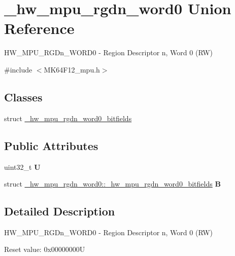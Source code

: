 \hypertarget{union__hw__mpu__rgdn__word0}{}\section{\+\_\+hw\+\_\+mpu\+\_\+rgdn\+\_\+word0 Union Reference}
\label{union__hw__mpu__rgdn__word0}


H\+W\+\_\+\+M\+P\+U\+\_\+\+R\+G\+Dn\+\_\+\+W\+O\+R\+D0 -\/ Region Descriptor n, Word 0 (RW)  




{\ttfamily \#include $<$M\+K64\+F12\+\_\+mpu.\+h$>$}

\subsection*{Classes}
\begin{DoxyCompactItemize}
\item 
struct \hyperlink{struct__hw__mpu__rgdn__word0_1_1__hw__mpu__rgdn__word0__bitfields}{\+\_\+hw\+\_\+mpu\+\_\+rgdn\+\_\+word0\+\_\+bitfields}
\end{DoxyCompactItemize}
\subsection*{Public Attributes}
\begin{DoxyCompactItemize}
\item 
uint32\+\_\+t {\bfseries U}\hypertarget{union__hw__mpu__rgdn__word0_ae0c9d26408ed2f45ca0b800fc688bbe4}{}\label{union__hw__mpu__rgdn__word0_ae0c9d26408ed2f45ca0b800fc688bbe4}

\item 
struct \hyperlink{struct__hw__mpu__rgdn__word0_1_1__hw__mpu__rgdn__word0__bitfields}{\+\_\+hw\+\_\+mpu\+\_\+rgdn\+\_\+word0\+::\+\_\+hw\+\_\+mpu\+\_\+rgdn\+\_\+word0\+\_\+bitfields} {\bfseries B}\hypertarget{union__hw__mpu__rgdn__word0_ae1785f992e4db41eea58c4ab9817931d}{}\label{union__hw__mpu__rgdn__word0_ae1785f992e4db41eea58c4ab9817931d}

\end{DoxyCompactItemize}


\subsection{Detailed Description}
H\+W\+\_\+\+M\+P\+U\+\_\+\+R\+G\+Dn\+\_\+\+W\+O\+R\+D0 -\/ Region Descriptor n, Word 0 (RW) 

Reset value\+: 0x00000000U

